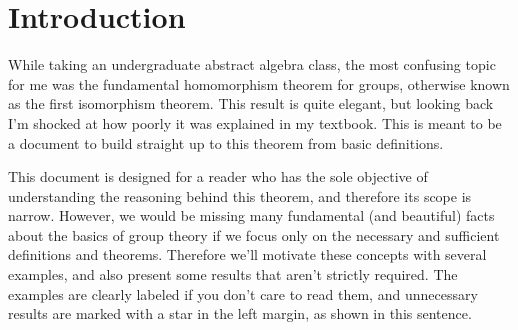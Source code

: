 \section{Introduction}

While taking an undergraduate abstract algebra class, the most confusing topic for me was the fundamental homomorphism theorem for groups, otherwise known as the first isomorphism theorem. This result is quite elegant, but looking back I'm shocked at how poorly it was explained in my textbook. This is meant to be a document to build straight up to this theorem from basic definitions.

This document is designed for a reader who has the sole objective of understanding the reasoning behind this theorem, and therefore its scope is narrow. However, we would be missing many fundamental (and beautiful) facts about the basics of  group theory if we focus only on the necessary and sufficient definitions and theorems. Therefore we'll motivate these concepts with several examples, and also present some results that aren't strictly required. \extra The examples are clearly labeled if you don't care to read them, and unnecessary results are marked with a star in the left margin, as shown in this sentence.